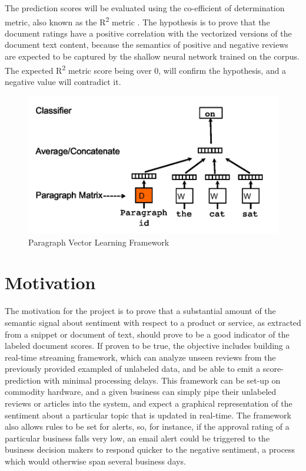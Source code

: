 \documentclass[conference]{IEEEtran}
\begin{document}
    The prediction scores will be evaluated using the co-efficient of determination metric, also known as the R\textsuperscript{2} metric \cite{cameron1997r}. The hypothesis is to prove that the document ratings have a positive correlation with the vectorized versions of the document text content, because the semantics of positive and negative reviews are expected to be captured by the shallow neural network trained on the corpus. The expected R\textsuperscript{2} metric score being over 0, will confirm the hypothesis, and a negative value will contradict it.

\begin{figure}[ht] \label{fig:paragraph-vector-framework}
    \centering
    \includegraphics[width=400pt]{images/docvec_1.png}
    \caption{Paragraph Vector Learning Framework\cite{mikolov2013distributed}}
\end{figure}

\vspace{5mm}

\section{Motivation}
    The motivation for the project is to prove that a substantial amount of the semantic signal about sentiment with respect to a product or service, as extracted from a snippet or document of text, should prove to be a good indicator of the labeled document scores. If proven to be true, the objective includes building a real-time streaming framework, which can analyze unseen reviews from the previously provided exampled of unlabeled data, and be able to emit a score-prediction with minimal processing delays. This framework can be set-up on commodity hardware, and a given business can simply pipe their unlabeled reviews or articles into the system, and expect a graphical representation of the sentiment about a particular topic that is updated in real-time. The framework also allows rules to be set for alerts, so, for instance, if the approval rating of a particular business falls very low, an email alert could be triggered to the business decision makers to respond quicker to the negative sentiment, a process which would otherwise span several business days.
\end{document}

